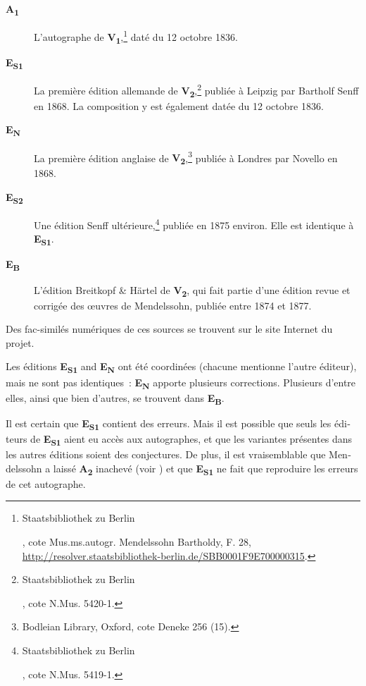 \documentclass[a4paper, 12pt]{book}
\newcommand{\source}[2]{\textbf{#1\textsubscript{#2}}}
\begin{document}
{\begin{otherlanguage}{french}
    \begin{description}
    \item[\source{A}{1}] L'autographe de
      \source{V}{1},\footnote{\begin{otherlanguage}{ngerman}Staatsbibliothek
          zu Berlin\end{otherlanguage}, cote
          Mus.ms.autogr. Mendelssohn Bartholdy, F. 28,
          \url{http://resolver.staatsbibliothek-berlin.de/SBB0001F9E700000315}.}
      daté du 12 octobre 1836.
    \item[\source{E}{S1}] La première édition allemande de
      \source{V}{2},\footnote{\begin{otherlanguage}{ngerman}Staatsbibliothek
          zu Berlin\end{otherlanguage}, \foreignlanguage{french}{cote} N.Mus. 5420-1.}
      publiée à Leipzig par Bartholf Senff en 1868. La composition y est également
      datée du 12 octobre 1836.
    \item[\source{E}{N}] La première édition anglaise de
      \source{V}{2},\footnote{Bodleian Library, Oxford, \foreignlanguage{french}{cote}
        Deneke 256 (15).} publiée à Londres par Novello en 1868.
    \item[\source{E}{S2}] Une édition Senff
      ultérieure,\footnote{\begin{otherlanguage}{ngerman}Staatsbibliothek
      zu Berlin\end{otherlanguage}, \foreignlanguage{french}{cote} N.Mus. 5419-1.}
      publiée en 1875 environ. Elle est identique à \source{E}{S1}.
    \item[\source{E}{B}] L'édition Breitkopf \& Härtel de
      \source{V}{2},
      qui fait partie d'une édition revue et corrigée des \oe uvres de Mendelssohn,
      publiée entre 1874 et 1877.
    \end{description}

    Des fac-similés numériques de ces sources se trouvent sur le site
    Internet du projet.

    Les éditions \source{E}{S1} and \source{E}{N} ont été coordinées
    (chacune mentionne l'autre éditeur), mais ne sont pas identiques~:
    \source{E}{N} apporte plusieurs corrections. Plusieurs d'entre
    elles, ainsi que bien d'autres, se trouvent dans \source{E}{B}.

    Il est certain que \source{E}{S1} contient des erreurs. Mais il
    est possible que seuls les éditeurs de \source{E}{S1} aient eu
    accès aux autographes, et que les variantes présentes dans les
    autres éditions soient des conjectures. De plus, il est
    vraisemblable que Mendelssohn a laissé \source{A}{2} inachevé
    (voir ) et que \source{E}{S1} ne fait que
    reproduire les erreurs de cet autographe.


\end{otherlanguage}}
\end{document}
